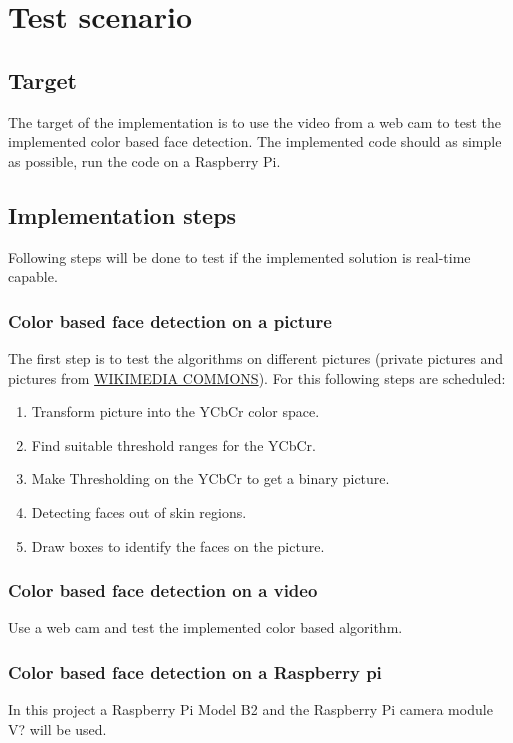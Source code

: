 \documentclass[Bachelorarbeit.tex]{subfiles}
\begin{document}
\chapter{Test scenario}
\section{Target}
The target of the implementation is to use the video from a web cam to test the implemented color based face detection. The implemented code should as simple as possible, run the code on a Raspberry Pi.

\section{Implementation steps}
Following steps will be done to test if the implemented solution is real-time capable.

\subsection{Color based face detection on a picture}
The first step is to test the algorithms on different pictures (private pictures and pictures from \href{https://commons.wikimedia.org/wiki/Main_Page}{WIKIMEDIA COMMONS}). For this following steps are scheduled:
\begin{enumerate}
\item Transform picture into the YCbCr color space.
\item Find suitable threshold ranges for the YCbCr.
\item Make Thresholding on the YCbCr to get a binary picture.
\item Detecting faces out of skin regions.
\item Draw boxes to identify the faces on the picture.
\end{enumerate}

\subsection{Color based face detection on a video}\label{CbVidoe}
Use a web cam and test the implemented color based algorithm.

\subsection{Color based face detection on a Raspberry pi}
In this project a Raspberry Pi Model B2 and the Raspberry Pi camera module V? will be used.
\end{document}
